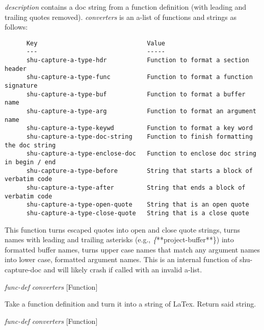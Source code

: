 \begin{doc-string}
\emph{description} contains a doc string from a function definition (with leading
and trailing quotes removed).  \emph{converters} is an a-list of functions and strings as
follows:

\small{\begin{verbatim}
      Key                              Value
      ---                              -----
      shu-capture-a-type-hdr           Function to format a section header
      shu-capture-a-type-func          Function to format a function signature
      shu-capture-a-type-buf           Function to format a buffer name
      shu-capture-a-type-arg           Function to format an argument name
      shu-capture-a-type-keywd         Function to format a key word
      shu-capture-a-type-doc-string    Function to finish formatting the doc string
      shu-capture-a-type-enclose-doc   Function to enclose doc string in begin / end
      shu-capture-a-type-before        String that starts a block of verbatim code
      shu-capture-a-type-after         String that ends a block of verbatim code
      shu-capture-a-type-open-quote    String that is an open quote
      shu-capture-a-type-close-quote   String that is a close quote
\end{verbatim}}

This function turns escaped quotes into open and close quote strings, turns names
with leading and trailing asterisks (e.g., \emph\{**project-buffer**\}) into formatted buffer
names, turns upper case names that match any argument names into lower case,
formatted argument names.  This is an internal function of shu-capture-doc and
will likely crash if called with an invalid a-list.
\end{doc-string}

\vspace{1em}
\noindent
{}
\usebox{\funcname}\emph{func-def} \emph{converters}
 \hfill [Function]
\hspace*{\wd\funcname}

\begin{doc-string}
Take a function definition and turn it into a string of LaTex.  Return said string.
\end{doc-string}

\vspace{1em}
\noindent
{}
\usebox{\funcname}\emph{func-def} \emph{converters}
 \hfill [Function]
\hspace*{\wd\funcname}

